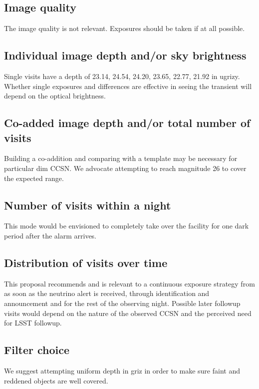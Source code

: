 \documentclass[11pt, letterpaper]{article}
\begin{document}
\subsection{Image quality}

The image quality is not relevant.  Exposures should be taken if at all possible.

\subsection{Individual image depth and/or sky brightness}

Single visits have a depth of 23.14,  24.54, 24.20, 23.65, 22.77,
21.92 in ugrizy.  Whether single exposures and differences are
effective in seeing the transient will depend on the optical brightness.

\subsection{Co-added image depth and/or total number of visits}

Building a co-addition and comparing with a template may be necessary
for particular dim CCSN.  We advocate attempting to reach magnitude 26
to cover the expected range.

\subsection{Number of visits within a night}

This mode would be envisioned to completely take over the facility for
one dark period after the alarm arrives.

\subsection{Distribution of visits over time}

This proposal recommends and is relevant to a continuous exposure
strategy from as soon as the neutrino alert is received, through
identification and announcement and for the rest of the observing
night.  Possible later followup visits would depend on the nature of
the observed CCSN and the perceived need for LSST followup.

\subsection{Filter choice}

We suggest attempting uniform depth in griz in order to make sure
faint and reddened objects are well covered.
\end{document}
